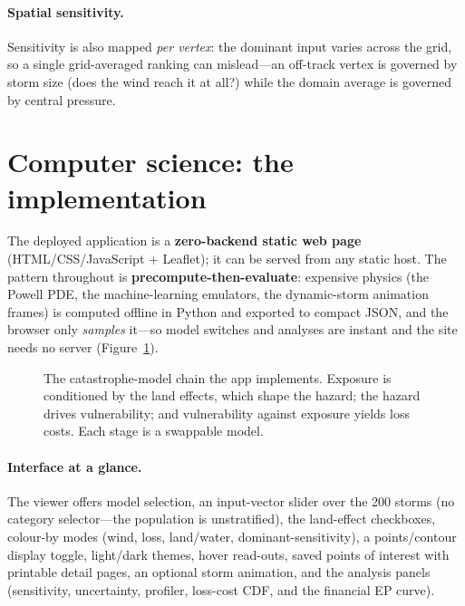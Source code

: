 \documentclass[11pt]{article}
\begin{document}
\paragraph{Spatial sensitivity.} Sensitivity is also mapped \emph{per vertex}: the
dominant input varies across the grid, so a single grid-averaged ranking can mislead---an
off-track vertex is governed by storm size (does the wind reach it at all?) while the
domain average is governed by central pressure.

\section{Computer science: the implementation}
The deployed application is a \textbf{zero-backend static web page}
(HTML/CSS/JavaScript + Leaflet); it can be served from any static host. The pattern
throughout is \textbf{precompute-then-evaluate}: expensive physics (the Powell PDE, the
machine-learning emulators, the dynamic-storm animation frames) is computed offline in
Python and exported to compact JSON, and the browser only \emph{samples} it---so model
switches and analyses are instant and the site needs no server (Figure~\ref{fig:flow}).

\begin{figure}[H]
\centering
{}
\caption{The catastrophe-model chain the app implements. Exposure is conditioned by the
land effects, which shape the hazard; the hazard drives vulnerability; and vulnerability
against exposure yields loss costs. Each stage is a swappable model.}
\label{fig:flow}
\end{figure}

\paragraph{Interface at a glance.} The viewer offers model selection, an input-vector
slider over the 200 storms (no category selector---the population is unstratified), the
land-effect checkboxes, colour-by modes (wind, loss, land/water, dominant-sensitivity), a
points/contour display toggle, light/dark themes, hover read-outs, saved points of
interest with printable detail pages, an optional storm animation, and the analysis
panels (sensitivity, uncertainty, profiler, loss-cost CDF, and the financial EP curve).
\end{document}
